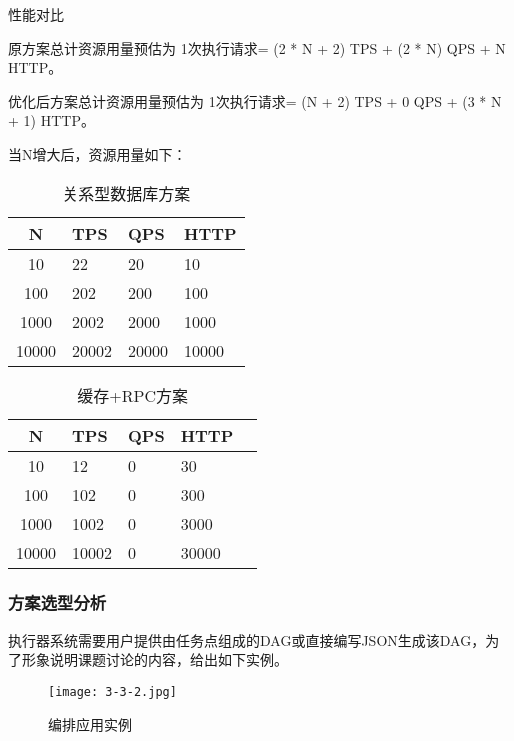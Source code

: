性能对比

原方案总计资源用量预估为 1次执行请求= (2 * N + 2) TPS + (2 * N) QPS + N HTTP。\cite{bansbach2021deep}

优化后方案总计资源用量预估为 1次执行请求= (N + 2) TPS + 0 QPS + (3 * N + 1) HTTP。

当N增大后，资源用量如下：
\begin{table}[H]
    \centering
    \caption{关系型数据库方案}
    \label{tab:old_status_resource}
    \begin{tabular}{clll}
        \toprule
        N	&TPS	&QPS	&HTTP \\
        \midrule
        10	    &22	    &20	    &10 \\
        100	    &202    &200	&100 \\
        1000	&2002	&2000	&1000 \\
        10000	&20002	&20000	&10000 \\
        \bottomrule
    \end{tabular}
\end{table}

\begin{table}[H]
    \centering
    \caption{缓存+RPC方案}
    \label{tab:new_status_resource}
    \begin{tabular}{cllll}
        \toprule
        N	&TPS	&QPS	&HTTP \\
        \midrule
        10	    &12  &0  &30 \\
        100	    &102  &0	&300 \\
        1000	&1002  &0	&3000 \\
        10000	&10002  &0	&30000 \\
        \bottomrule
    \end{tabular}
\end{table}


\subsubsection{方案选型分析}
执行器系统需要用户提供由任务点组成的DAG或直接编写JSON生成该DAG，为了形象说明课题讨论的内容，给出如下实例。

\begin{figure}[H]
    \centering
    \texttt{[image: 3-3-2.jpg]}
    \caption{编排应用实例}
    \label{fig:编排应用实例}
\end{figure}

